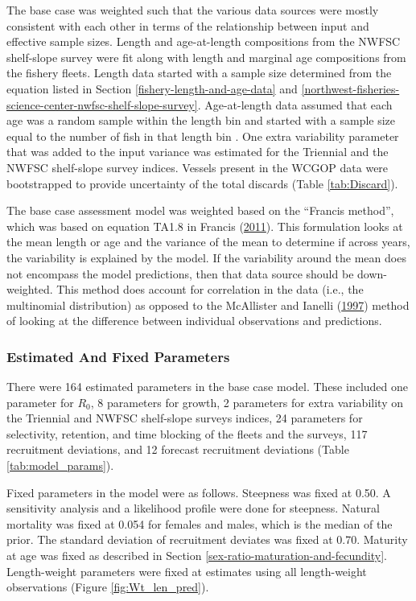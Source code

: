 \documentclass[12pt,]{article}
\begin{document}
The base case was weighted such that the various data sources were
mostly consistent with each other in terms of the relationship between
input and effective sample sizes. Length and age-at-length compositions
from the NWFSC shelf-slope survey were fit along with length and
marginal age compositions from the fishery fleets. Length data started
with a sample size determined from the equation listed in Section
\ref{fishery-length-and-age-data} and
\ref{northwest-fisheries-science-center-nwfsc-shelf-slope-survey}.
Age-at-length data assumed that each age was a random sample within the
length bin and started with a sample size equal to the number of fish in
that length bin . One extra variability parameter that was added to the
input variance was estimated for the Triennial and the NWFSC shelf-slope
survey indices. Vessels present in the WCGOP data were bootstrapped to
provide uncertainty of the total discards (Table \ref{tab:Discard}).

The base case assessment model was weighted based on the ``Francis
method'', which was based on equation TA1.8 in Francis
(\protect\hyperlink{ref-francis_data_2011}{2011}). This formulation
looks at the mean length or age and the variance of the mean to
determine if across years, the variability is explained by the model. If
the variability around the mean does not encompass the model
predictions, then that data source should be down-weighted. This method
does account for correlation in the data (i.e., the multinomial
distribution) as opposed to the McAllister and Ianelli
(\protect\hyperlink{ref-mcallister_bayesian_1997}{1997}) method of
looking at the difference between individual observations and
predictions.

\subsubsection{Estimated And Fixed
Parameters}\label{estimated-and-fixed-parameters}

There were 164 estimated parameters in the base case model. These
included one parameter for \(R_0\), 8 parameters for growth, 2
parameters for extra variability on the Triennial and NWFSC shelf-slope
surveys indices, 24 parameters for selectivity, retention, and time
blocking of the fleets and the surveys, 117 recruitment deviations, and
12 forecast recruitment deviations (Table \ref{tab:model_params}).

Fixed parameters in the model were as follows. Steepness was fixed at
0.50. A sensitivity analysis and a likelihood profile were done for
steepness. Natural mortality was fixed at 0.054 for females and males,
which is the median of the prior. The standard deviation of recruitment
deviates was fixed at 0.70. Maturity at age was fixed as described in
Section \ref{sex-ratio-maturation-and-fecundity}. Length-weight
parameters were fixed at estimates using all length-weight observations
(Figure \ref{fig:Wt_len_pred}).
\end{document}
